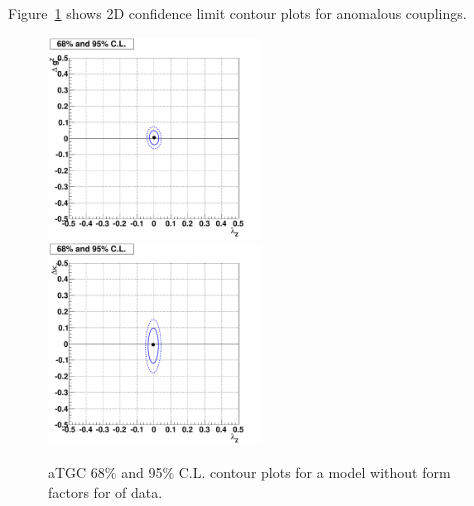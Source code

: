 Figure~\ref{fig:contour} shows 2D confidence limit contour plots for
anomalous couplings.

\begin{figure}[tp]
  \centerline{
    \includegraphics[width=0.5\textwidth]{figures/lz_dgz_contourplot}
    \includegraphics[width=0.5\textwidth]{figures/lz_dkg_contourplot}
  }

  \caption[Contour plots for data] {aTGC 68\% and 95\% C.L. contour
    plots for a model without form factors for \intlumi of data.}
  \label{fig:contour}
\end{figure}

